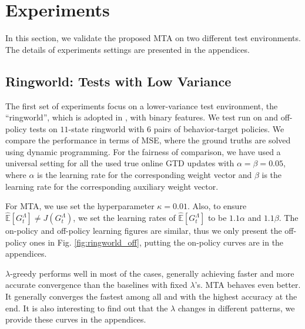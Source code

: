 \documentclass{article}
\newcommand\doubleE{\mathbb{E}}
\begin{document}
\section{Experiments}\label{sec:experiments}
In this section, we validate the proposed MTA on two different test environments. The details of experiments settings are presented in the appendices.

\subsection{Ringworld: Tests with Low Variance}
The first set of experiments focus on a lower-variance test environment, the ``ringworld'', which is adopted in \cite{white2016greedy}, with binary features. We test run on and off-policy tests on $11$-state ringworld with $6$ pairs of behavior-target policies. We compare the performance in terms of MSE, where the ground truths are solved using dynamic programming. For the fairness of comparison, we have used a universal setting for all the used true online GTD updates with $\alpha = \beta = 0.05$, where $\alpha$ is the learning rate for the corresponding weight vector and $\beta$ is the learning rate for the corresponding auxiliary weight vector.
\par
For MTA, we use set the hyperparameter $\kappa = 0.01$. Also, to ensure $\hat{\doubleE}[G_t^\Lambda] \neq J(G_t^\Lambda)$, we set the learning rates of $\hat{\doubleE}[G_t^\Lambda]$ to be $1.1\alpha$ and $1.1\beta$. The on-policy and off-policy learning figures are similar, thus we only present the off-policy ones in Fig. \ref{fig:ringworld_off}, putting the on-policy curves are in the appendices.
\par
$\lambda$-greedy performs well in most of the cases, generally achieving faster and more accurate convergence than the baselines with fixed $\lambda$'s. MTA behaves even better. It generally converges the fastest among all and with the highest accuracy at the end. It is also interesting to find out that the $\lambda$ changes in different patterns, we provide these curves in the appendices.
\end{document}
